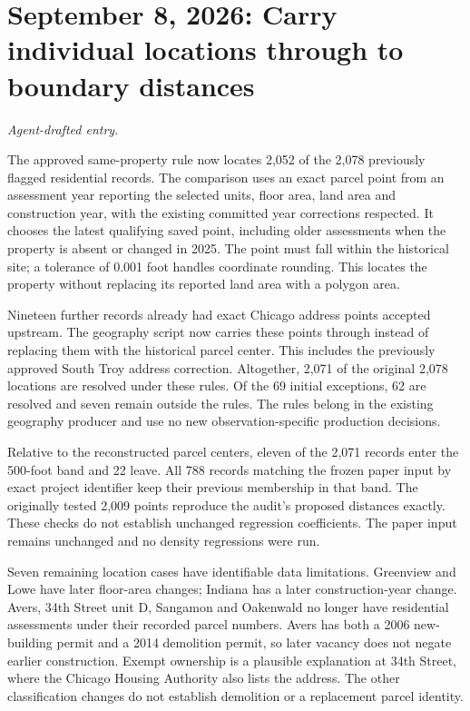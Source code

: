 \clearpage
\section*{September 8, 2026: Carry individual locations through to boundary distances}
\textit{Agent-drafted entry.}

The approved same-property rule now locates 2,052 of the 2,078 previously flagged residential records. The comparison uses an exact parcel point from an assessment year reporting the selected units, floor area, land area and construction year, with the existing committed year corrections respected. It chooses the latest qualifying saved point, including older assessments when the property is absent or changed in 2025. The point must fall within the historical site; a tolerance of 0.001 foot handles coordinate rounding. This locates the property without replacing its reported land area with a polygon area.

Nineteen further records already had exact Chicago address points accepted upstream. The geography script now carries these points through instead of replacing them with the historical parcel center. This includes the previously approved South Troy address correction. Altogether, 2,071 of the original 2,078 locations are resolved under these rules. Of the 69 initial exceptions, 62 are resolved and seven remain outside the rules. The rules belong in the existing geography producer and use no new observation-specific production decisions.

Relative to the reconstructed parcel centers, eleven of the 2,071 records enter the 500-foot band and 22 leave. All 788 records matching the frozen paper input by exact project identifier keep their previous membership in that band. The originally tested 2,009 points reproduce the audit's proposed distances exactly. These checks do not establish unchanged regression coefficients. The paper input remains unchanged and no density regressions were run.

Seven remaining location cases have identifiable data limitations. Greenview and Lowe have later floor-area changes; Indiana has a later construction-year change. Avers, 34th Street unit D, Sangamon and Oakenwald no longer have residential assessments under their recorded parcel numbers. Avers has both a 2006 new-building permit and a 2014 demolition permit, so later vacancy does not negate earlier construction. Exempt ownership is a plausible explanation at 34th Street, where the Chicago Housing Authority also lists the address. The other classification changes do not establish demolition or a replacement parcel identity.

